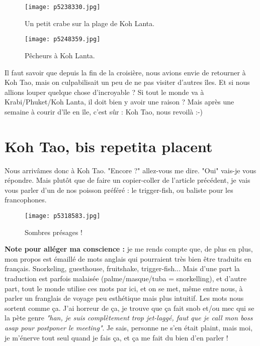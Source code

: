 \documentclass{book}
\begin{document}
\begin{figure}[h]
\centering
\texttt{[image: p5238330.jpg]}
\caption*{Un petit crabe sur la plage de Koh Lanta.}
\end{figure}


\begin{figure}[h]
\centering
\texttt{[image: p5248359.jpg]}
\caption*{Pêcheurs à Koh Lanta.}
\end{figure}

Il faut savoir que depuis la fin de la croisière, nous avions envie de retourner à Koh Tao, mais on culpabilisait un peu de ne pas visiter d'autres îles. Et si nous allions louper quelque chose d'incroyable ? Si tout le monde va à Krabi/Phuket/Koh Lanta, il doit bien y avoir une raison ? Mais après une semaine à courir d'île en île, c'est sûr : Koh Tao, nous revoilà :-)



\chapter{Koh Tao, bis repetita placent}
Nous arrivâmes donc à Koh Tao. "Encore ?" allez-vous me dire. "Oui" vais-je vous répondre. Mais plutôt que de faire un copier-coller de l'article précédent, je vais vous parler d'un de nos poisson préféré : le trigger-fish, ou baliste pour les francophones.


\begin{figure}[h]
\centering
\texttt{[image: p5318583.jpg]}
\caption*{Sombres présages !}
\end{figure}

\textbf{Note pour alléger ma conscience :} je me rends compte que, de plus en plus, mon propos est émaillé de mots anglais qui pourraient très bien être traduits en français. Snorkeling, guesthouse, fruitshake, trigger-fish... Mais d'une part la traduction est parfois malaisée (palme/masque/tuba = snorkelling), et d'autre part, tout le monde utilise ces mots par ici, et on se met, même entre nous, à parler un franglais de voyage peu esthétique mais plus intuitif. Les mots nous sortent comme ça. J'ai horreur de ça, je trouve que ça fait snob et/ou mec qui se la pète genre \emph{"han, je suis complètement trop jet-laggé, faut que je call mon boss asap pour postponer le meeting"}. Je sais, personne ne s'en était plaint, mais moi, je m'énerve tout seul quand je fais ça, et ça me fait du bien d'en parler !
\end{document}
